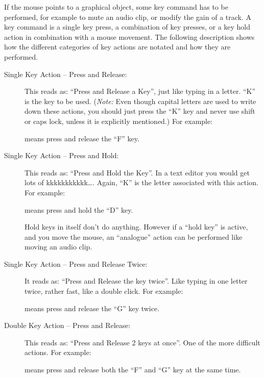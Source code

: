 If the mouse points to a graphical object, some key command has to be performed, for example to mute an audio clip, or modify the gain of a track. A key command is a single key press, a combination of key presses, or a key hold action in combination with a mouse movement. The following description shows how the different categories of key actions are notated and how they are performed.

\begin{description}
\item[Single Key Action  -- Press and Release:]
This reads as: ``Press and Release a Key'', just like typing in a letter.
``K'' is the key to be used. (\emph{Note:} Even though capital letters are used to write down these actions, you should just press the ``K'' key and never use shift or caps lock, unless it is explicitly mentioned.) For example:
\begin{quotation}
\end{quotation}
means press and release the ``F'' key.

\item[Single Key Action  -- Press and Hold:]
This reads as: ``Press and Hold the Key''. In a text editor you would get lots of kkkkkkkkkkk\dots.
Again, ``K'' is the letter associated with this action. For example:
\begin{quotation}
\end{quotation}
means press and hold the ``D'' key.

Hold keys in itself don't do anything. However if a ``hold key'' is active, and you move the mouse, an ``analogue'' action can be performed like moving an audio clip.

\item[Single Key Action  -- Press and Release Twice:]
It reads as: ``Press and Release the key twice''. Like typing in one letter twice, rather fast, like a double click. For example:
\begin{quotation}
\end{quotation}
means press and release the ``G'' key twice.

\item[Double Key Action  -- Press and Release:]
This reads as: ``Press and Release 2 keys at once''. One of the more difficult actions. For example:
\begin{quotation}
\end{quotation}
means press and release both the ``F'' and ``G'' key at the same time.


\end{description}
